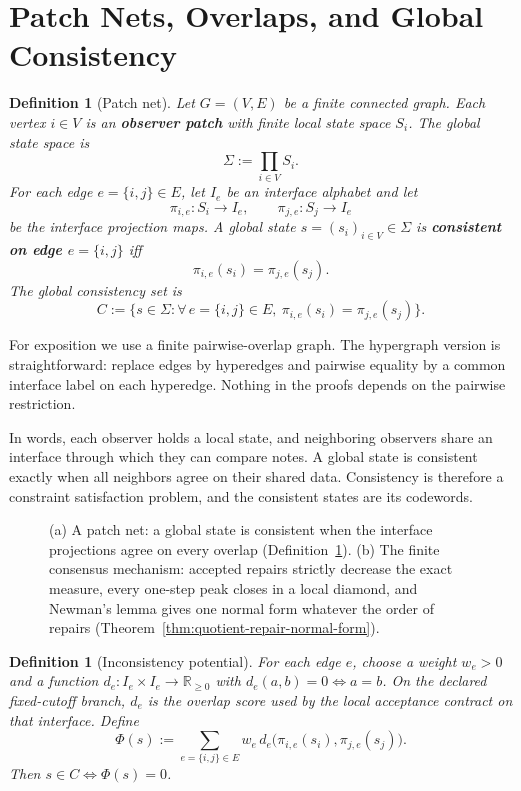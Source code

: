 \documentclass[11pt]{article}
\newtheorem{definition}[theorem]{Definition}
\theoremstyle{remark}
\theoremstyle{plain}
\begin{document}
\section{Patch Nets, Overlaps, and Global Consistency}

\begin{definition}[Patch net]\label{def:patchnet}
Let $G=(V,E)$ be a finite connected graph. Each vertex $i\in V$ is an \textbf{observer patch} with finite local state space $S_i$. The global state space is
\[
\Sigma := \prod_{i\in V} S_i.
\]
For each edge $e=\{i,j\}\in E$, let $I_e$ be an interface alphabet and let
\[
\pi_{i,e}:S_i\to I_e,
\qquad
\pi_{j,e}:S_j\to I_e
\]
be the interface projection maps. A global state $s=(s_i)_{i\in V}\in\Sigma$ is \textbf{consistent on edge $e=\{i,j\}$} iff
\[
\pi_{i,e}(s_i)=\pi_{j,e}(s_j).
\]
The global consistency set is
\[
C:=\bigl\{s\in\Sigma:\forall\, e=\{i,j\}\in E,\ \pi_{i,e}(s_i)=\pi_{j,e}(s_j)\bigr\}.
\]
\end{definition}

For exposition we use a finite pairwise-overlap graph. The hypergraph version is straightforward: replace edges by hyperedges and pairwise equality by a common interface label on each hyperedge. Nothing in the proofs depends on the pairwise restriction.

In words, each observer holds a local state, and neighboring observers share an interface through which they can compare notes. A global state is consistent exactly when all neighbors agree on their shared data. Consistency is therefore a constraint satisfaction problem, and the consistent states are its codewords.

\begin{figure}[!htb]
\centering

\caption{(a) A patch net: a global state is consistent when the interface projections agree on every overlap (Definition~\ref{def:patchnet}). (b) The finite consensus mechanism: accepted repairs strictly decrease the exact measure, every one-step peak closes in a local diamond, and Newman's lemma gives one normal form whatever the order of repairs (Theorem~\ref{thm:quotient-repair-normal-form}).}
\label{fig:consensus}
\end{figure}

\begin{definition}[Inconsistency potential]\label{def:potential}
For each edge $e$, choose a weight $w_e>0$ and a function $d_e:I_e\times I_e\to\mathbb{R}_{\ge 0}$ with $d_e(a,b)=0 \iff a=b$. On the declared fixed-cutoff branch, \(d_e\) is the overlap score used by the local acceptance contract on that interface. Define
\[
\Phi(s)
:=
\sum_{e=\{i,j\}\in E}
w_e\, d_e\!\bigl(\pi_{i,e}(s_i),\pi_{j,e}(s_j)\bigr).
\]
Then $s\in C \iff \Phi(s)=0$.
\end{definition}
\end{document}
